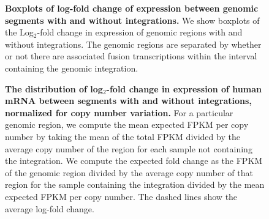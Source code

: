 \documentclass[12pt]{article}
\begin{document}
\begin{figure}[htpb]
  \centering
\caption[Log$_2$-fold change of expression between genomic segments with
  and without integrations.]  {\label{all_expression_box} {\bf Boxplots of
    log-fold change of expression between genomic segments with and
    without integrations.}  We show boxplots of the Log$_2$-fold change
  in expression of genomic regions with and without integrations.  The
  genomic regions are separated by whether or not there are associated
  fusion transcriptions within the interval containing the genomic integration.}
\end{figure}

\begin{figure}[htpb]
  \centering
\caption[The distribution of log$_2$-fold change in expression of human mRNA between segments with and without integrations, normalized for copy number variation.]  {\label{cnv_fold_change} {\bf The distribution of log$_2$-fold change in expression of human mRNA between segments with and without integrations, normalized for copy number variation.}  For a particular genomic region, we compute the mean expected FPKM per copy number by taking the mean of the total FPKM divided by the average copy number of the region for each sample not containing the integration.  We compute the expected fold change as the FPKM of the genomic region divided by the average copy number of that region for the sample containing the integration divided by the mean expected FPKM per copy number.  The dashed lines show the average log-fold change.}
\end{figure}


\end{document}
